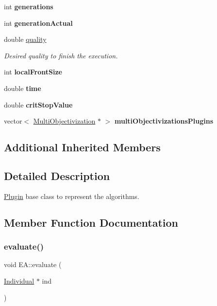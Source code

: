 \begin{DoxyCompactItemize}
int {\bfseries generations}
\item 
\mbox{\label{classEA_a7c2e3fae5ef87767765d58d9637e0d29}} 
int {\bfseries generation\+Actual}
\item 
double \mbox{\hyperlink{classEA_ad62e844dcae9b5c7724ab56a9aea2dc9}{quality}}
\begin{DoxyCompactList}\small\item\em Desired quality to finish the execution. \end{DoxyCompactList}\item 
\mbox{\label{classEA_add005610c438f386a0e1297f40f99294}} 
int {\bfseries local\+Front\+Size}
\item 
\mbox{\label{classEA_a76be177471c03a1c37b2e562d0ad51cf}} 
double {\bfseries time}
\item 
\mbox{\label{classEA_af18fabb320c08ef9de16fd9877272211}} 
double {\bfseries crit\+Stop\+Value}
\item 
\mbox{\label{classEA_a40edcfb8016401e5ea73b8188731026b}} 
vector$<$ \mbox{\hyperlink{classMultiObjectivization}{Multi\+Objectivization}} $\ast$ $>$ {\bfseries multi\+Objectivizations\+Plugins}
\end{DoxyCompactItemize}
\subsection*{Additional Inherited Members}


\subsection{Detailed Description}
\mbox{\hyperlink{classPlugin}{Plugin}} base class to represent the algorithms. 

\subsection{Member Function Documentation}
\mbox{\label{classEA_a65e719d5e3a3cff67139d1e81f092cec}} 
\subsubsection{\texorpdfstring{evaluate()}{evaluate()}}
{\footnotesize\ttfamily void E\+A\+::evaluate (\begin{DoxyParamCaption}\item[{\mbox{\hyperlink{classIndividual}{Individual}} $\ast$}]{ind }\end{DoxyParamCaption})}



